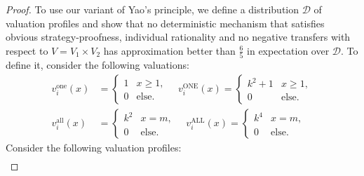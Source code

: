 \begin{proof}
To  use 
    our variant of Yao's principle, 
we define a distribution $\mathcal D$ of valuation profiles
    and show that no deterministic mechanism that satisfies
    obvious strategy-proofness, individual rationality and no negative transfers with respect to $V=V_1\times V_2$ has approximation better than $\frac{6}{5}$ in expectation over $\mathcal D$. 
    To define it, 
consider the following valuations:  
\[
\renewcommand{\arraystretch}{1}
\begin{aligned}
v_i^{\text{one}}(x) &= \begin{cases}
1 & x \geq 1,\\
0 & \text{else.}
\end{cases}
\quad
v_i^{\text{ONE}}(x) = \begin{cases}
k^2 + 1 & x \geq 1,\\
0 & \text{else.}
\end{cases}\\[4pt]
v_i^{\text{all}}(x) &= \begin{cases}
k^2 & x=m,\\
0 & \text{else.}
\end{cases}
\quad
v_i^{\text{ALL}}(x) = \begin{cases}
k^4 & x=m,\\
0 & \text{else.}
\end{cases}
\end{aligned}
\]
Consider the following valuation profiles:
\[
\begin{aligned}

\end{aligned}\]
\end{proof}

